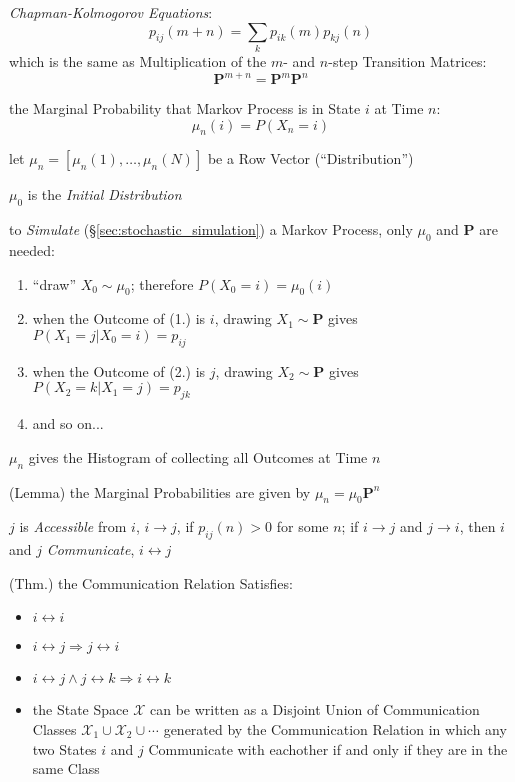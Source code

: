 \emph{Chapman-Kolmogorov Equations}:
\[
  p_{ij}(m + n) = \sum_k p_{ik}(m) p_{kj}(n)
\]
which is the same as Multiplication of the $m$- and $n$-step Transition
Matrices:
\[
  \mathbf{P}^{m+n} = \mathbf{P}^m \mathbf{P}^n
\]

the Marginal Probability that Markov Process is in State $i$ at Time $n$:
\[
  \mu_n(i) = P(X_n = i)
\]

let $\mu_n = [\mu_n(1), \ldots, \mu_n(N)]$ be a Row Vector (``Distribution'')

$\mu_0$ is the \emph{Initial Distribution}

to \emph{Simulate} (\S\ref{sec:stochastic_simulation}) a Markov Process, only
$\mu_0$ and $\mathbf{P}$ are needed:
\begin{enumerate}
  \item ``draw'' $X_0 \sim \mu_0$; therefore $P(X_0 = i) = \mu_0(i)$
  \item when the Outcome of (1.) is $i$, drawing $X_1 \sim \mathbf{P}$ gives
    $P(X_1 = j | X_0 = i) = p_{ij}$
  \item when the Outcome of (2.) is $j$, drawing $X_2 \sim \mathbf{P}$ gives
    $P(X_2 = k | X_1 = j) = p_{jk}$
  \item and so on...
\end{enumerate}

$\mu_n$ gives the Histogram of collecting all Outcomes at Time $n$

(Lemma) the Marginal Probabilities are given by $\mu_n = \mu_0 \mathbf{P}^n$

$j$ is \emph{Accessible} from $i$, $i \rightarrow j$, if $p_{ij}(n) > 0$ for
some $n$; if $i \rightarrow j$ and $j \rightarrow i$, then $i$ and $j$
\emph{Communicate}, $i \leftrightarrow j$

(Thm.) the Communication Relation Satisfies:
\begin{itemize}
  \item $i \leftrightarrow i$
  \item $i \leftrightarrow j \Longrightarrow j \leftrightarrow i$
  \item $i \leftrightarrow j \wedge j \leftrightarrow k \Longrightarrow
    i \leftrightarrow k$
  \item the State Space $\mathcal{X}$ can be written as a Disjoint Union of
    Communication Classes $\mathcal{X}_1 \cup \mathcal{X}_2 \cup \cdots$
    generated by the Communication Relation in which any two States $i$ and $j$
    Communicate with eachother if and only if they are in the same Class
\end{itemize}

